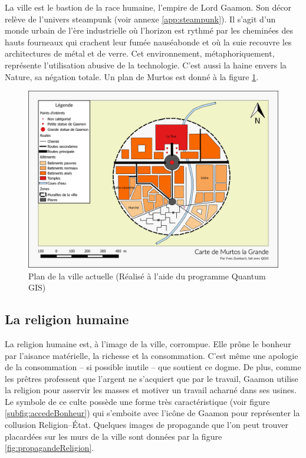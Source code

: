 La ville est le bastion de la race humaine, l'empire de Lord Gaamon. Son décor relève de l'univers steampunk (voir annexe \ref{app:steampunk}). Il s'agit d'un monde urbain de l'ère industrielle où l'horizon est rythmé par les cheminées des hauts fourneaux qui crachent leur fumée nauséabonde et où la suie recouvre les architectures de métal et de verre. Cet environnement, métaphoriquement, représente l'utilisation abusive de la technologie. C'est aussi la haine envers la Nature, sa négation totale. Un plan de Murtos est donné à la figure \ref{fig:murtosLaGrande}.

\begin{figure}[h!]
	\hspace*{-2cm}\includegraphics[width=\textwidth+2cm]{images/Monde/carteVille.png}
	\caption{Plan de la ville actuelle (Réalisé à l'aide du programme Quantum GIS)}
	\label{fig:murtosLaGrande}
\end{figure}



\subsection{La religion humaine}
La religion humaine est, à l'image de la ville, corrompue. Elle prône le bonheur par l'aisance matérielle, la richesse et la consommation. C'est même une apologie de la consommation -- si possible inutile -- que soutient ce dogme. De plus, comme les prêtres professent que l'argent ne s'acquiert que par le travail, Gaamon utilise la religion pour asservir les masses et motiver un travail acharné dans ses usines. Le symbole de ce culte possède une forme très caractéristique (voir figure \ref{subfig:accedeBonheur}) qui s'emboite avec l'icône de Gaamon pour représenter la collusion Religion--État. Quelques images de propagande que l'on peut trouver placardées sur les murs de la ville sont données par la figure \ref{fig:propagandeReligion}.

